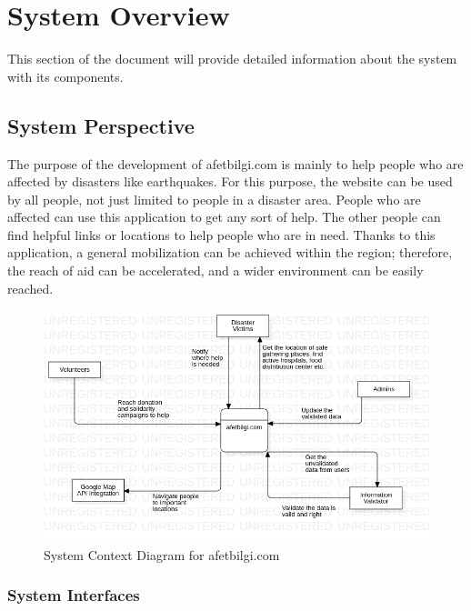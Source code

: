 \section{System Overview}

This section of the document will provide detailed information about the system with its components. 

\subsection{System Perspective}

The purpose of the development of afetbilgi.com is mainly to help people who are affected by disasters like earthquakes.
For this purpose, the website can be used by all people, not just limited to people in a disaster area. 
People who are affected can use this application to get any sort of help.
The other people can find helpful links or locations to help people who are in need. 
Thanks to this application, a general mobilization can be achieved within the region; therefore, the reach of aid can be accelerated, and a wider environment can be easily reached.
\begin{figure}[H]
    \begin{center}
        \includegraphics[scale = 0.60]{assets/SystemContextDiagram.png}
        \caption[System Context Diagram]{System Context Diagram for afetbilgi.com}
    \end{center}
\end{figure}

\subsubsection{System Interfaces}

